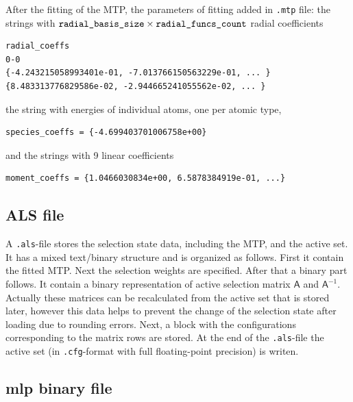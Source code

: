 \documentclass[12pt]{article}
\renewcommand{\_}{\char`_}
\begin{document}
\noindent After the fitting of the MTP, the parameters of fitting added in \verb|.mtp| file: the strings with $\verb|radial_basis_size| \times \verb|radial_funcs_count|$ radial coefficients
\begin{verbatim}
radial_coeffs
0-0
{-4.243215058993401e-01, -7.013766150563229e-01, ... }
{8.483313776829586e-02, -2.944665241055562e-02, ... }
\end{verbatim}
the string with energies of individual atoms, one per atomic type,
\begin{verbatim}
species_coeffs = {-4.699403701006758e+00}
\end{verbatim}
and the strings with 9 linear coefficients
\begin{verbatim}
moment_coeffs = {1.0466030834e+00, 6.5878384919e-01, ...}
\end{verbatim}

\subsection{ALS file}\label{sup:mlip:als}

A \verb|.als|-file stores the selection state data, including the MTP, and the active set. It has a mixed text/binary structure and is organized as follows. First it contain the fitted MTP. Next the selection weights are specified. After that a binary part follows. It contain a binary representation of active selection matrix $\mathsf A$ and $\mathsf A^{-1}$. Actually these matrices can be recalculated from the active set that is stored later, however this data helps to prevent the change of the selection state after loading due to rounding errors.
Next, a block with the configurations corresponding to the matrix rows are stored.
At the end of the \verb|.als|-file the active set (in \verb|.cfg|-format with full floating-point precision) is writen. 

\subsection{mlp binary file}\label{sup:mlip:mlp}
\end{document}
